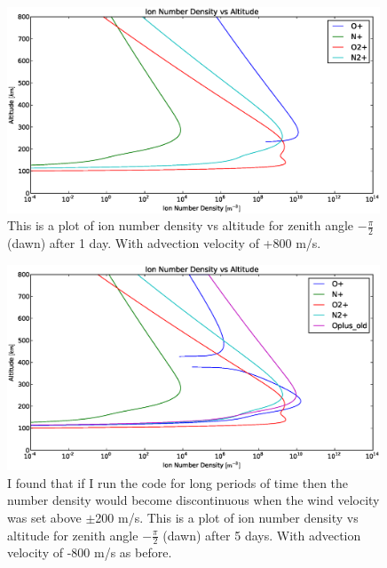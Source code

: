 \documentclass[10pt]{article}
\begin{document}
\begin{figure}[H]
	\centering
		\includegraphics[width=0.99\textwidth]{./figures/B/use/Ion_Number_Density_vs_Altitude_100_800_+800.eps}
	\caption{This is a plot of ion number density vs altitude for zenith angle $-\frac{\pi}{2}$ (dawn) after 1 day. With advection velocity of +800 m/s.}
	\label{fig:n4}
\end{figure}
\begin{figure}[H]
	\centering
		\includegraphics[width=0.99\textwidth]{./figures/B/use/Ion_Number_Density_vs_Altitude_100_800_-800_5days.eps}
	\caption{I found that if I run the code for long periods of time then the number density would become discontinuous when the wind velocity was set above $\pm$200 m/s. This is a plot of ion number density vs altitude for zenith angle $-\frac{\pi}{2}$ (dawn) after 5 days. With advection velocity of -800 m/s as before.}
	\label{fig:n4}
\end{figure}
\end{document}
